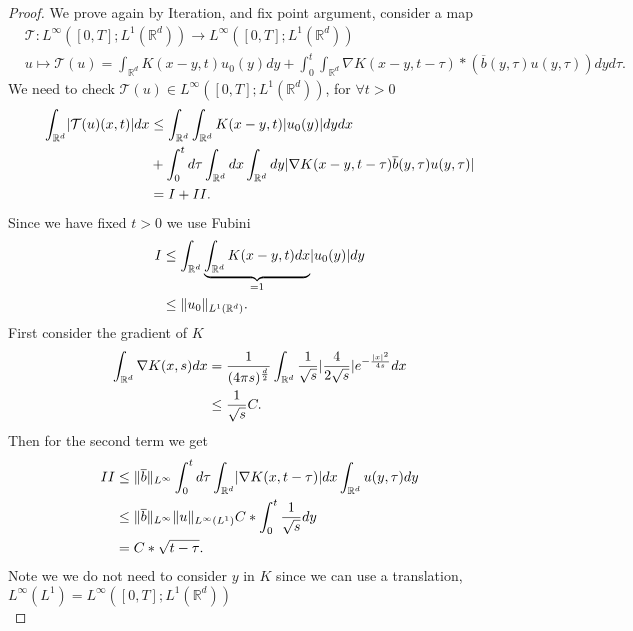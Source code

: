 \begin{proof}
 We prove again by Iteration, and fix point argument, consider a map 
 \begin{align*}
   &\mathcal{T} : L^{\infty}([0,T];L^1(\mathbb{R}^{d} )) \to L^{\infty}([0,T];L^1(\mathbb{R}^{d} ))\\
   &u \mapsto \mathcal{T}(u) = \int_{\mathbb{R}^{d} }K(x-y,t)u_{0}(y) dy  + \int_{0}^{t} \int_{\mathbb{R}^{d} } \nabla K(x-y,t-\tau ) * (\overline{b}(y,\tau )u(y,\tau ) ) dy d\tau 
 .\end{align*}
 We need to check $\mathcal{T}(u) \in  L^{\infty}([0,T];L^{1}(\mathbb{R}^{d} ) ) $, for $\forall  t >0$
 \begin{align*}
   \int_{\mathbb{R}^{d} }\lvert\mathcal{T}(u)(x,t)\rvert dx &\le \int_{\mathbb{R}^{d} } \int_{\mathbb{R}^{d} } K(x-y,t)\lvert u_0(y)\rvert dy dx \\
                                                      &+ \int_0^{t}  d\tau \int_{\mathbb{R}^{d} }dx \int_{\mathbb{R}^{d} } dy \lvert\nabla K(x-y,t-\tau )\overline{b} (y,\tau )u(y,\tau )\rvert\\
                                                      &= I + II
 .\end{align*}
  Since we have fixed $t >0$ we use Fubini 
  \begin{align*}
    I &\le \int_{\mathbb{R}^{d} }\underbrace{\int_{\mathbb{R}^{d} }K(x-y,t) dx}_{=1} \lvert u_0(y)\rvert dy\\
      &\le \|u_{0}\|_{L^{1}(\mathbb{R}^{d} ) }
  .\end{align*}
  First consider the gradient of $K$
  \begin{align*}
    \int_{\mathbb{R}^{d} }\nabla K(x,s) dx  &= \frac{1}{(4 \pi s)^{\frac{d}{2}} } \int_{\mathbb{R}^{d} } \frac{1}{\sqrt{s} }\lvert\frac{4}{2 \sqrt{s} }\rvert e^{-\frac{\lvert x\rvert^2}{4s}} dx \\
                                            &\le  \frac{1}{\sqrt{s} }C
  .\end{align*}
  Then for the second term we get 
  \begin{align*}
    II &\le  \|\overline{b} \|_{L^{\infty} }\int_{0}^{t}  d\tau  \int_{\mathbb{R}^{d} } \lvert\nabla K(x,t-\tau )\rvert dx \int_{\mathbb{R}^{d} }u(y,\tau )dy\\
       &\le \|\overline{b} \|_{L^{\infty} } \|u\|_{L^{\infty}(L^1) } C*\int_0^{t}  \frac{1}{\sqrt{s} } dy \\
       &=  C*\sqrt{t-\tau } 
  .\end{align*}
  Note we we do not need to consider $y$ in $K$ since we can use a translation,$L^{\infty}(L^{1} ) = L^{\infty}([0,T];L^{1}(\mathbb{R}^{d} ) )  $ \\[1ex]

\end{proof}
